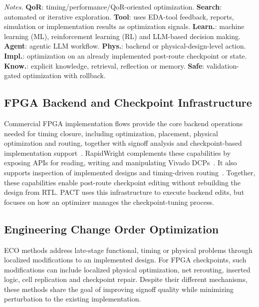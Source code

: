 \documentclass[conference]{IEEEtran}
\begin{document}
\begin{table}[t]
\vspace{0.5mm}
\begin{minipage}{0.98\columnwidth}
\scriptsize
\emph{Notes.}
\textbf{QoR}: timing/performance/QoR-oriented
optimization.
\textbf{Search}: automated or iterative exploration.
\textbf{Tool}: uses EDA-tool feedback, reports,
simulation or implementation results as optimization
signals.
\textbf{Learn.}: machine learning (ML), reinforcement learning (RL)
and LLM-based decision making.
\textbf{Agent}: agentic LLM workflow.
\textbf{Phys.}: backend or physical-design-level
action.
\textbf{Impl.}: optimization on an already implemented
post-route checkpoint or state.
\textbf{Know.}: explicit knowledge, retrieval, reflection
or memory.
\textbf{Safe}: validation-gated optimization with rollback.
\end{minipage}
\end{table}

\subsection{FPGA Backend and Checkpoint Infrastructure}
\label{sec:backend-cad-checkpoint-substrates}
\label{sec:rapidwright-based-frameworks}

Commercial FPGA implementation flows provide the core backend
operations needed for timing closure, including optimization,
placement, physical optimization and routing, together with signoff
analysis and checkpoint-based implementation
support~\cite{amd_ug904_2025,amd_ug906_2025,amd_ug949_2025,
amd_ug894_2025,amd_ug938_2025}. RapidWright complements these
capabilities by exposing APIs for
reading, writing and manipulating Vivado DCPs~\cite{rapidwright_documentation_2025}. It also supports
inspection of implemented designs and timing-driven
routing~\cite{zhou_rwroute_2022}. Together, these capabilities enable
post-route checkpoint editing without rebuilding the design from RTL.
PACT uses this infrastructure to execute backend edits, but focuses on
how an optimizer manages the checkpoint-tuning process.

\subsection{Engineering Change Order Optimization}
\label{sec:eco-related-work}

ECO methods address late-stage functional,
timing or physical problems through localized modifications to an
implemented design. For FPGA checkpoints, such
modifications can include
localized physical optimization, net rerouting, inserted logic, cell
replication and checkpoint repair. Despite their different
mechanisms, these methods share the goal of improving signoff quality
while minimizing perturbation to the existing implementation.
\end{document}
